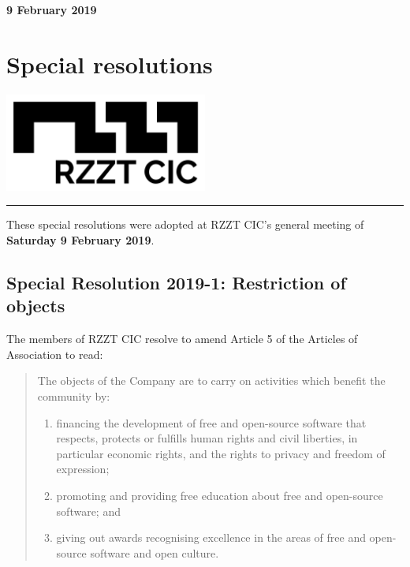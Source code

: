 \documentclass[a4paper,10pt]{article}
\begin{document}
\thispagestyle{firstpage}

\begin{minipage}[b]{0.5\textwidth}
  \textbf{9 February 2019}
  \section{Special resolutions}
\end{minipage}
%
\begin{minipage}[b]{0.5\textwidth}
  \raggedleft
  \includegraphics[width=0.5\textwidth]{logo-black.jpg}
\end{minipage}

\hrule

\vspace{2em}

These special resolutions were adopted at RZZT CIC's general meeting of \textbf{Saturday 9 February 2019}.

\subsection{Special Resolution 2019-1: Restriction of objects}

The members of RZZT CIC resolve to amend Article 5 of the Articles of Association to read:

\begin{framed}
  \begin{quote}
    The objects of the Company are to carry on activities which benefit the community by:
    \begin{enumerate}
      \itemsep0em
      \renewcommand{\labelenumi}{(\alph{enumi})}
      \item financing the development of free and open-source software that respects, protects or fulfills human rights and civil liberties, in particular economic rights, and the rights to privacy and freedom of expression;
      \item promoting and providing free education about free and open-source software; and
      \item giving out awards recognising excellence in the areas of free and open-source software and open culture.
    \end{enumerate}
  \end{quote}
\end{framed}
\end{document}
